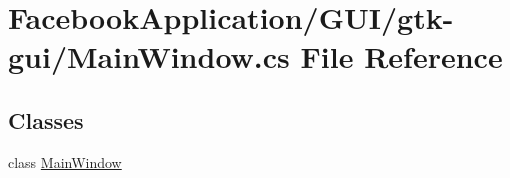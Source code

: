 \hypertarget{gtk-gui_2_main_window_8cs}{}\section{Facebook\+Application/\+G\+U\+I/gtk-\/gui/\+Main\+Window.cs File Reference}
\label{gtk-gui_2_main_window_8cs}
\subsection*{Classes}
\begin{DoxyCompactItemize}
\item 
class \hyperlink{class_main_window}{Main\+Window}
\end{DoxyCompactItemize}
